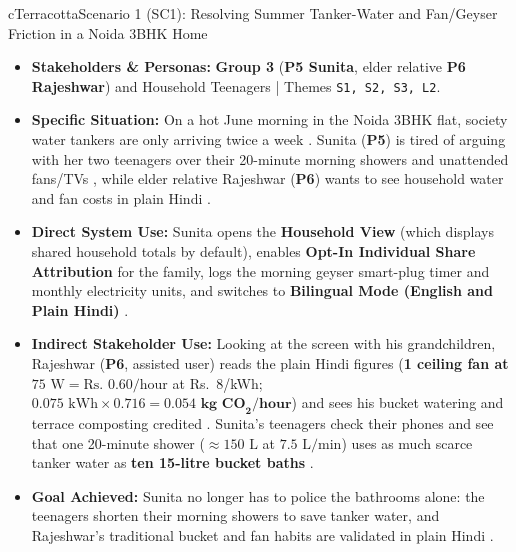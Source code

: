 \documentclass[12pt, a4paper]{article}
\begin{document}
\begin{scenariocard}{cTerracotta}{Scenario 1 (SC1): Resolving Summer Tanker-Water and Fan/Geyser Friction in a Noida 3BHK Home}
\footnotesize
\begin{itemize}
    \item \textbf{Stakeholders \& Personas:} \textbf{Group 3} (\textbf{P5 Sunita}, elder relative \textbf{P6 Rajeshwar}) and Household Teenagers | Themes \texttt{S1, S2, S3, L2}.
    \item \textbf{Specific Situation:} On a hot June morning in the Noida 3BHK flat, society water tankers are only arriving twice a week \cite{cf3}. Sunita (\textbf{P5}) is tired of arguing with her two teenagers over their 20-minute morning showers and unattended fans/TVs \cite{cf3}, while elder relative Rajeshwar (\textbf{P6}) wants to see household water and fan costs in plain Hindi \cite{cf8}.
    \item \textbf{Direct System Use:} Sunita opens the \textbf{Household View} (which displays shared household totals by default), enables \textbf{Opt-In Individual Share Attribution} for the family, logs the morning geyser smart-plug timer and monthly electricity units, and switches to \textbf{Bilingual Mode (English and Plain Hindi)} \cite{cf3}.
    \item \textbf{Indirect Stakeholder Use:} Looking at the screen with his grandchildren, Rajeshwar (\textbf{P6}, assisted user) reads the plain Hindi figures (\textbf{1 ceiling fan at $75\text{ W} = \text{Rs.\ } 0.60/\text{hour}$} at Rs.\ 8/kWh; $0.075\text{ kWh} \times 0.716 = \mathbf{0.054\text{ kg CO}_2/\text{hour}}$) and sees his bucket watering and terrace composting credited \cite{cea2023, cf3, cf8}. Sunita's teenagers check their phones and see that one 20-minute shower ($\approx 150\text{ L}$ at $7.5\text{ L/min}$) uses as much scarce tanker water as \textbf{ten 15-litre bucket baths} \cite{cf3}.
    \item \textbf{Goal Achieved:} Sunita no longer has to police the bathrooms alone: the teenagers shorten their morning showers to save tanker water, and Rajeshwar's traditional bucket and fan habits are validated in plain Hindi \cite{cf3, cf8}.
\end{itemize}
\end{scenariocard}
\end{document}
